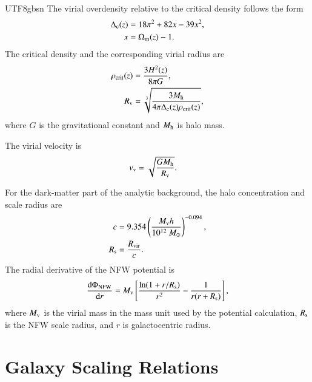 \documentclass[trackchanges, twocolappendix, twocolumn]{aastex701}
\begin{document}
\begin{CJK*}{UTF8}{gbsn}
The virial overdensity relative to the critical density follows the \cite{Bryan&Norman1998DM} form
\begin{align}
\Delta_{\rm c} (z) & = 18 \pi^2 + 82 x - 39 x^2 , \\
x &= \Omega_{\rm m}(z)-1 .
\end{align}
The critical density and the corresponding virial radius are
\begin{align}
\rho_{\rm crit} (z) & = \dfrac{3 H^2 (z)}{8 \pi G} , \\
R_{\rm v} & = \sqrt[3]{ \dfrac{3 M_{\rm h}}{4\pi \Delta_{\rm c} (z) \rho_{\rm crit} (z)} } ,
\end{align}
where $G$ is the gravitational constant and $M_{\rm h}$ is halo mass.

The virial velocity is
\begin{align}
v_{\rm v} & = \sqrt{\dfrac{G M_{\rm h}}{R_{\rm v}}} .
\end{align}

For the dark-matter part of the analytic background, the halo concentration and scale radius are
\begin{align}
c &= 9.354
\left(\dfrac{M_{\rm v}h}{10^{12}~M_\odot}\right)^{-0.094},\\
R_{\rm s} &= \dfrac{R_{\rm vir}}{c}.
\end{align}
The radial derivative of the NFW potential is
\begin{align}
\dfrac{\mathrm{d} \Phi_{\rm NFW}}{\mathrm{d} r} = M_{\rm v} \left[ \dfrac{\ln (1 + r / R_{\rm s})}{r^2} - \dfrac{1}{r (r + R_{\rm s})} \right] ,
\end{align}
where $M_{\rm v}$ is the virial mass in the mass unit used by the potential calculation, $R_{\rm s}$ is the NFW scale radius, and $r$ is galactocentric radius.

\section{Galaxy Scaling Relations} \label{appendix:galaxy}


\end{CJK*}
\end{document}
